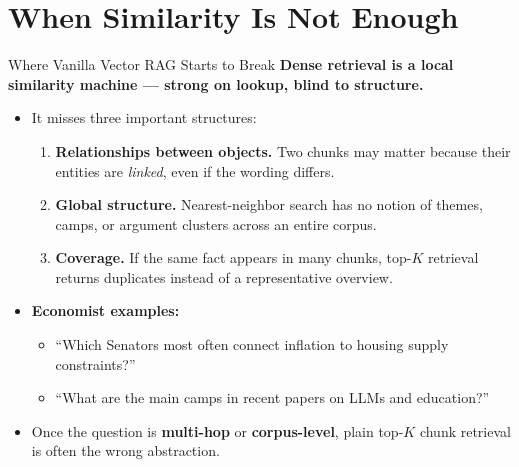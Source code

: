 \section{When Similarity Is Not Enough}

\begin{frame}{Where Vanilla Vector RAG Starts to Break}
\textbf{Dense retrieval is a local similarity machine --- strong on lookup, blind to structure.}

\medskip
\begin{itemize}
\item It misses three important structures:
\begin{enumerate}
    \item \textbf{Relationships between objects.} Two chunks may matter because their entities are \emph{linked}, even if the wording differs.
    \item \textbf{Global structure.} Nearest-neighbor search has no notion of themes, camps, or argument clusters across an entire corpus.
    \item \textbf{Coverage.} If the same fact appears in many chunks, top-$K$ retrieval returns duplicates instead of a representative overview.
\end{enumerate}

\medskip
\item \textbf{Economist examples:}
\begin{itemize}
    \item ``Which Senators most often connect inflation to housing supply constraints?''
    \item ``What are the main camps in recent papers on LLMs and education?''
\end{itemize}

\medskip
\item Once the question is \textbf{multi-hop} or \textbf{corpus-level}, plain top-$K$ chunk retrieval is often the wrong abstraction.
\end{itemize}
\end{frame}

